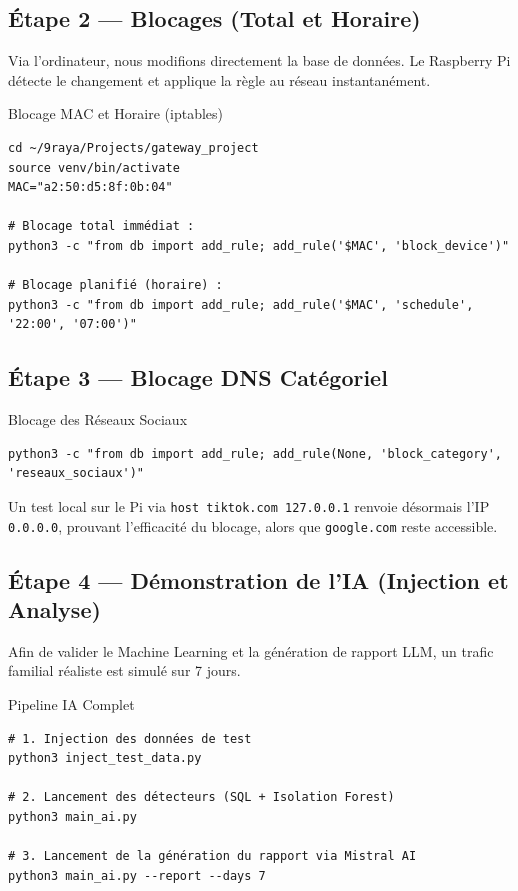 \documentclass[11pt,a4paper]{article}
\begin{document}
\subsection{Étape 2 — Blocages (Total et Horaire)}
Via l'ordinateur, nous modifions directement la base de données. Le Raspberry Pi détecte le changement et applique la règle au réseau instantanément.
\begin{stepcadre}{Blocage MAC et Horaire (iptables)}
\begin{lstlisting}[language=BashShell]
cd ~/9raya/Projects/gateway_project
source venv/bin/activate
MAC="a2:50:d5:8f:0b:04"

# Blocage total immédiat :
python3 -c "from db import add_rule; add_rule('$MAC', 'block_device')"

# Blocage planifié (horaire) :
python3 -c "from db import add_rule; add_rule('$MAC', 'schedule', '22:00', '07:00')"
\end{lstlisting}
\end{stepcadre}

\subsection{Étape 3 — Blocage DNS Catégoriel}
\begin{stepcadre}{Blocage des Réseaux Sociaux}
\begin{lstlisting}[language=BashShell]
python3 -c "from db import add_rule; add_rule(None, 'block_category', 'reseaux_sociaux')"
\end{lstlisting}
\end{stepcadre}

\begin{infocadre}
Un test local sur le Pi via \texttt{host tiktok.com 127.0.0.1} renvoie désormais l'IP \texttt{0.0.0.0}, prouvant l'efficacité du blocage, alors que \texttt{google.com} reste accessible.
\end{infocadre}

\newpage
\subsection{Étape 4 — Démonstration de l'IA (Injection et Analyse)}
Afin de valider le Machine Learning et la génération de rapport LLM, un trafic familial réaliste est simulé sur 7 jours.
\begin{stepcadre}{Pipeline IA Complet}
\begin{lstlisting}[language=BashShell]
# 1. Injection des données de test
python3 inject_test_data.py

# 2. Lancement des détecteurs (SQL + Isolation Forest)
python3 main_ai.py

# 3. Lancement de la génération du rapport via Mistral AI
python3 main_ai.py --report --days 7
\end{lstlisting}
\end{stepcadre}
\end{document}

